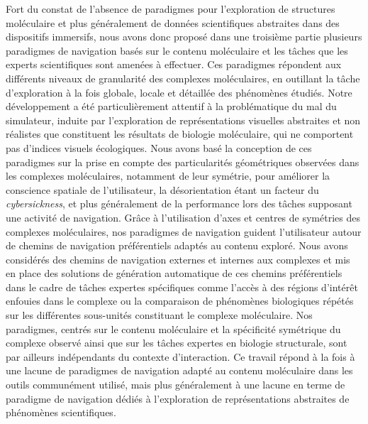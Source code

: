 {%

Fort du constat de l'absence de paradigmes pour l'exploration de structures moléculaire et plus généralement de données scientifiques abstraites dans des dispositifs immersifs, nous avons donc proposé dans une troisième partie plusieurs paradigmes de navigation basés sur le contenu moléculaire et les tâches que les experts scientifiques sont amenées à effectuer. Ces paradigmes répondent aux différents niveaux de granularité des complexes moléculaires, en outillant la tâche d'exploration à la fois globale, locale et détaillée des phénomènes étudiés. Notre développement a été particulièrement attentif à la problématique du mal du simulateur, induite par l'exploration de représentations visuelles abstraites et non réalistes que constituent les résultats de biologie moléculaire, qui ne comportent pas d'indices visuels écologiques. Nous avons basé la conception de ces paradigmes sur la prise en compte des particularités géométriques observées dans les complexes moléculaires, notamment de leur symétrie, pour améliorer la conscience spatiale de l'utilisateur, la désorientation étant un facteur du \textit{cybersickness}, et plus généralement de la performance lors des tâches supposant une activité de navigation. Grâce à l'utilisation d'axes et centres de symétries des complexes moléculaires, nos paradigmes de navigation guident l'utilisateur autour de chemins de navigation préférentiels adaptés au contenu exploré. Nous avons considérés des chemins de navigation externes et internes aux complexes et mis en place des solutions de génération automatique de ces chemins préférentiels dans le cadre de tâches expertes spécifiques comme l'accès à des régions d'intérêt enfouies dans le complexe ou la comparaison de phénomènes biologiques répétés sur les différentes sous-unités constituant le complexe moléculaire.
Nos paradigmes, centrés sur le contenu moléculaire et la spécificité symétrique du complexe observé ainsi que sur les tâches expertes en biologie structurale, sont par ailleurs indépendants du contexte d'interaction. Ce travail répond à la fois à une lacune de paradigmes de navigation adapté au contenu moléculaire dans les outils communément utilisé, mais plus généralement à une lacune en terme de paradigme de navigation dédiés à l'exploration de représentations abstraites de phénomènes scientifiques. 


}
